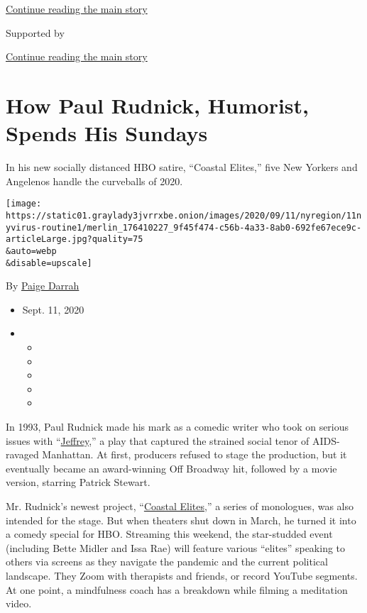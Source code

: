 \protect\hyperlink{after-top}{Continue reading the main story}

Supported by

\protect\hyperlink{after-sponsor}{Continue reading the main story}

\hypertarget{how-paul-rudnick-humorist-spends-his-sundays}{%
\section{How Paul Rudnick, Humorist, Spends His
Sundays}\label{how-paul-rudnick-humorist-spends-his-sundays}}

In his new socially distanced HBO satire, ``Coastal Elites,'' five New
Yorkers and Angelenos handle the curveballs of 2020.

\texttt{[image: https://static01.graylady3jvrrxbe.onion/images/2020/09/11/nyregion/11nyvirus-routine1/merlin\_176410227\_9f45f474-c56b-4a33-8ab0-692fe67ece9c-articleLarge.jpg?quality=75\\\&auto=webp\\\&disable=upscale]}

By \href{https://www.nytimes3xbfgragh.onion/by/paige-darrah}{Paige
Darrah}

\begin{itemize}
\item
  Sept. 11, 2020
\item
  \begin{itemize}
  \item
  \item
  \item
  \item
  \item
  \end{itemize}
\end{itemize}

In 1993, Paul Rudnick made his mark as a comedic writer who took on
serious issues with
``\href{https://www.nytimes3xbfgragh.onion/1993/01/21/theater/review-theater-laughs-that-mask-the-fears-of-gay-manhattan.html?searchResultPosition=7}{Jeffrey},''
a play that captured the strained social tenor of AIDS-ravaged
Manhattan. At first, producers refused to stage the production, but it
eventually became an award-winning Off Broadway hit, followed by a movie
version, starring Patrick Stewart.

Mr. Rudnick's newest project,
``\href{https://www.hbo.com/specials/coastal-elites}{Coastal Elites},''
a series of monologues, was also intended for the stage. But when
theaters shut down in March, he turned it into a comedy special for HBO.
Streaming this weekend, the star-studded event (including Bette Midler
and Issa Rae) will feature various ``elites'' speaking to others via
screens as they navigate the pandemic and the current political
landscape. They Zoom with therapists and friends, or record YouTube
segments. At one point, a mindfulness coach has a breakdown while
filming a meditation video.

